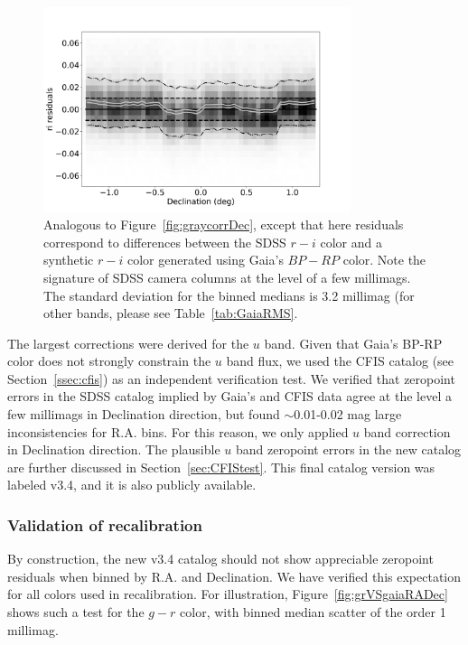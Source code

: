 \begin{figure}[th!]
    \centering\includegraphics[width=9cm]{figures/colorResidGaiaColorsB_ri_Dec_Hess.png} 
\caption{Analogous to Figure~\ref{fig:graycorrDec}, except that here residuals 
correspond to differences between the SDSS $r-i$ color and a synthetic $r-i$ color
generated using Gaia's $BP-RP$ color. Note the signature of SDSS camera columns
at the level of a few millimags. The standard deviation for the binned medians is 
3.2 millimag (for other bands, please see Table~\ref{tab:GaiaRMS}.}
\label{fig:riresid}
\end{figure}


The largest corrections were derived for the $u$ band. Given that Gaia's BP-RP
color does not strongly constrain the $u$ band flux, we used the CFIS catalog 
(see Section~\ref{ssec:cfis}) as an independent verification test. We verified that
zeropoint errors in the SDSS catalog implied by Gaia's and CFIS data agree at the
level a few millimags in Declination direction, but found $\sim$0.01-0.02 mag
large inconsistencies for R.A. bins. For this reason, we only applied $u$ band 
correction in Declination direction. The plausible $u$ band zeropoint errors in 
the new catalog are further discussed in Section~\ref{sec:CFIStest}. This final 
catalog version was labeled v3.4, and it is also publicly available. 



\subsubsection{Validation of recalibration  \label{sec:SSCvsGaia}} 
  
By construction, the new v3.4 catalog should not show appreciable zeropoint residuals when 
binned by R.A. and Declination. We have verified this expectation for all colors used in 
recalibration. For illustration, Figure~\ref{fig:grVSgaiaRADec} shows such a test for the $g-r$ 
color, with binned median scatter of the order 1 millimag. 

